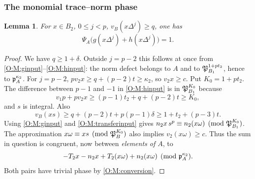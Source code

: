 \documentclass[11pt]{amsart}
\newtheorem{lemma}[theorem]{Lemma}
\theoremstyle{definition}
\theoremstyle{remark}
\begin{document}
\subsubsection*{The monomial trace--norm phase}
\begin{lemma}\label{O:M:monophase}
For $x\in B_2$, $0\le j<p$, $v_B(x\Delta^j)\ge q$, one has
\[
 \Psi_A\bigl(g(x\Delta^j)+h(x\Delta^j)\bigr)=1.
\]
\end{lemma}
\begin{proof}
We have $q\ge1+\delta$. Outside $j=p-2$ this follows at once from
\eqref{O:M:ginput}--\eqref{O:M:hinput}: the norm defect belongs to $A$ and to
$\mathfrak P_{B_1}^{1+pt_2}$, hence to $\mathfrak p_A^{\kappa_2}$.
For $j=p-2$, $pv_2x\ge q+(p-2)t\ge \kappa_2$, so $v_2x\ge c$.
Put $K_0=1+pt_2$. The difference between $p-1$ and $-1$ in
\eqref{O:M:hinput} is in $\mathfrak P_{B_1}^{K_0}$ because
\[
 v_1p+pv_2x\ge(p-1)t_2+q+(p-2)t\ge K_0,
\]
and $s$ is integral. Also
\[
 v_B(xs)\ge q+(p-2)t+p(p-1)\delta
       \ge1+t_2+(p-3)t.
\]
Using \eqref{O:M:ginput} and \eqref{O:M:transferinput} gives
$n_2x\,s^p\equiv n_2(x\omega)\pmod{\mathfrak P_{B_1}^{K_0}}$.
The approximation $x\omega\equiv xs\pmod{\mathfrak P_B^{K_0}}$ also implies
$v_2(x\omega)\ge c$. Thus the sum in question is congruent, now between
\emph{elements of $A$}, to
\[
 -T_2x-n_2x+T_2(x\omega)+n_2(x\omega)\pmod{\mathfrak p_A^{\kappa_2}}.
\]
Both pairs have trivial phase by \eqref{O:M:conversion}.
\end{proof}
\end{document}
